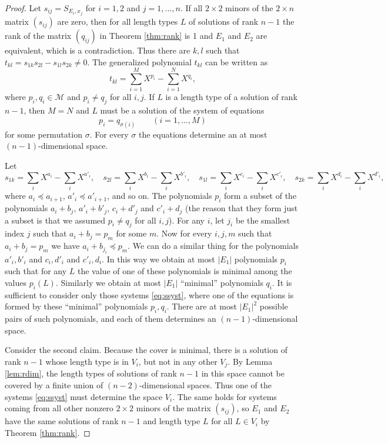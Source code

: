 \documentclass[submission]{eptcs}
\theoremstyle{definition}
\newcommand{\sx}[2]{ S_{#1,#2} }
\newcommand{\lhp}{\mathcal M}
\begin{document}
\begin{proof}
Let
\begin{math}
    s_{ij} = \sx{E_i}{x_j}
\end{math}
for $i = 1, 2$ and $j = 1, \dots, n$. If all $2 \times 2$ minors of
the $2 \times n$ matrix $(s_{ij})$ are zero, then for all length
types $L$ of solutions of rank $n-1$ the rank of the matrix
$(q_{ij})$ in Theorem \ref{thm:rank} is 1 and $E_1$ and $E_2$ are
equivalent, which is a contradiction. Thus there are $k,l$ such that
$t_{kl} = s_{1k} s_{2l} - s_{1l} s_{2k} \ne 0$. The generalized
polynomial $t_{kl}$ can be written as
\begin{equation*}
   t_{kl} = \sum_{i=1}^M X^{p_i} - \sum_{i=1}^N X^{q_i},
\end{equation*}
where $p_i, q_i \in \lhp$ and $p_i \ne q_j$ for all $i,j$. If $L$ is
a length type of a solution of rank $n-1$, then $M=N$ and $L$ must
be a solution of the system of equations
\begin{equation} \label{eq:ssyst}
    p_i = q_{\sigma(i)} \qquad (i=1,\dots,M)
\end{equation}
for some permutation $\sigma$. For every $\sigma$ the equations
determine an at most $(n-1)$-dimensional space.

Let
\begin{equation*}
    s_{1k} = \sum_i X^{a_i} - \sum_i X^{a'_i},
    \quad
    s_{2l} = \sum_i X^{b_i} - \sum_i X^{b'_i},
    \quad
    s_{1l} = \sum_i X^{c_i} - \sum_i X^{c'_i},
    \quad
    s_{2k} = \sum_i X^{d_i} - \sum_i X^{d'_i},
\end{equation*}
where $a_i \preceq a_{i+1}$, $a'_i \preceq a'_{i+1}$, and so on. The
polynomials $p_i$ form a subset of the polynomials $a_i + b_j$,
$a'_i + b'_j$, $c_i + d'_j$ and $c'_i + d_j$ (the reason that they
form just a subset is that we assumed $p_i \ne q_j$ for all $i,j$).
For any $i$, let $j_i$ be the smallest index $j$ such that $a_i +
b_j = p_m$ for some $m$. Now for every $i,j,m$ such that $a_i + b_j
= p_m$ we have $a_i + b_{j_i} \preceq p_m$. We can do a similar
thing for the polynomials $a'_i, b'_i$ and $c_i, d'_i$ and $c'_i,
d_i$. In this way we obtain at most $|E_1|$ polynomials $p_i$ such
that for any $L$ the value of one of these polynomials is minimal
among the values $p_i(L)$. Similarly we obtain at most $|E_1|$
``minimal'' polynomials $q_i$. It is sufficient to consider only
those systems \eqref{eq:ssyst}, where one of the equations is formed
by these ``minimal'' polynomials $p_i, q_i$. There are at most
$|E_1|^2$ possible pairs of such polynomials, and each of them
determines an $(n-1)$-dimensional space.

Consider the second claim. Because the cover is minimal, there is a
solution of rank $n-1$ whose length type is in $V_i$, but not in any
other $V_j$. By Lemma \ref{lem:rdim}, the length types of solutions
of rank $n-1$ in this space cannot be covered by a finite union of
$(n-2)$-dimensional spaces. Thus one of the systems \eqref{eq:ssyst}
must determine the space $V_i$. The same holds for systems coming
from all other nonzero $2 \times 2$ minors of the matrix $(s_{ij})$,
so $E_1$ and $E_2$ have the same solutions of rank $n-1$ and length
type $L$ for all $L \in V_i$ by Theorem \ref{thm:rank}.
\end{proof}
\end{document}
